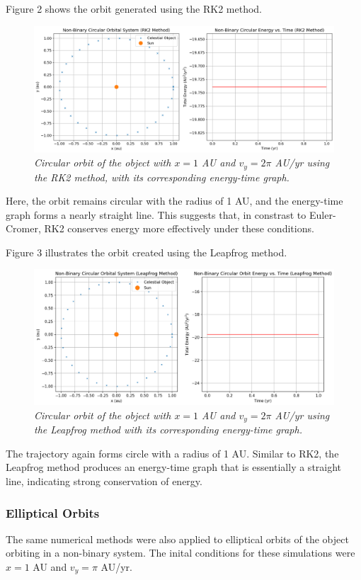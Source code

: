 \documentclass[11 pt, a4paper, twocolumn]{article}
\begin{document}
Figure 2 shows the orbit generated using the RK2 method.
\begin{figure}[H] 
  \includegraphics[width=1\linewidth]{RK2/rk2circular.png}
  \centering
  \caption{\textit{Circular orbit of the object with $x = 1$ AU and $v_y = 2\pi$ AU/yr using the RK2 
  method, with its corresponding energy-time graph.}}
\end{figure}
\vspace{-3em}
Here, the orbit remains circular with the radius of 1 AU, and the energy-time graph forms a nearly 
straight line. This suggests that, in constrast to Euler-Cromer, RK2 conserves energy more effectively
under these conditions.

Figure 3 illustrates the orbit created using the Leapfrog method.
\begin{figure}[H]
  \includegraphics[width=1\linewidth]{Leapfrog/leapfrogcircular.png}
  \centering
  \caption{\textit{Circular orbit of the object with $x = 1$ AU and $v_y = 2\pi$ AU/yr using the 
  Leapfrog method with its corresponding energy-time graph.}}
\end{figure}
\vspace{-1em}
The trajectory again forms circle with a radius of 1 AU. Similar to RK2, the Leapfrog method produces an
energy-time graph that is essentially a straight line, indicating strong conservation of energy.

\subsubsection{Elliptical Orbits}
The same numerical methods were also applied to elliptical orbits of the object orbiting in a non-binary
system. The inital conditions for these simulations were $x=1$ AU and $v_y = \pi$ AU/yr.
\end{document}
